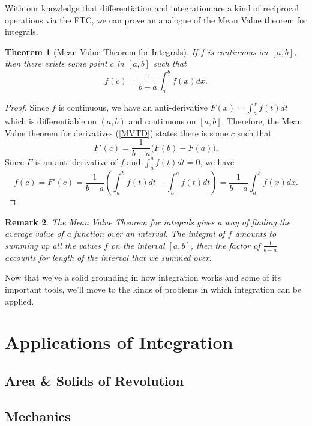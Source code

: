 \documentclass[12pt]{article}
\newtheorem{thm}{Theorem}[section]
\theoremstyle{definition}
\theoremstyle{plain}
\newtheorem{rem}[thm]{Remark}
\numberwithin{equation}{section}
\begin{document}
With our knowledge that differentiation and integration are a kind of reciprocal operations via the FTC, we can prove an analogue of the Mean Value theorem for integrals.
\begin{thm}[Mean Value Theorem for Integrals]
  If $f$ is continuous on $[a,b]$, then there exists some point $c$ in $[a,b]$ such that
  \begin{equation}
    f(c)=\frac{1}{b-a}\int_{a}^{b}f(x)dx.
  \end{equation}
\end{thm}
\begin{proof}
  Since $f$ is continuous, we have an anti-derivative $F(x)=\int_{a}^{x}f(t)dt$ which is differentiable on $(a,b)$ and continuous on $[a,b]$. Therefore, the Mean Value theorem for derivatives (\cref{MVTD}) states there is some $c$ such that
  \begin{equation}
    F'(c)=\frac{1}{b-a}\big(F(b)-F(a) \big).
  \end{equation}
  Since $F$ is an anti-derivative of $f$ and $\int_{a}^{a}f(t)dt=0$, we have
\begin{equation}
  f(c)=F'(c)=\frac{1}{b-a}\left( \int_{a}^{b}f(t)dt-\int_{a}^{a}f(t)dt \right)=\frac{1}{b-a}\int_{a}^{b}f(x)dx.
\end{equation}
\end{proof}
\begin{rem}
  The Mean Value Theorem for integrals gives a way of finding the average value of a function over an interval. The integral of $f$ amounts to summing up all the values $f$ on the interval $[a,b]$, then the factor of $\frac{1}{b-a}$ accounts for length of the interval that we summed over.
\end{rem}

Now that we've a solid grounding in how integration works and some of its important tools, we'll move to the kinds of problems in which integration can be applied.
\section{Applications of Integration}


\subsection{Area \& Solids of Revolution}

\subsection{Mechanics}
\end{document}
